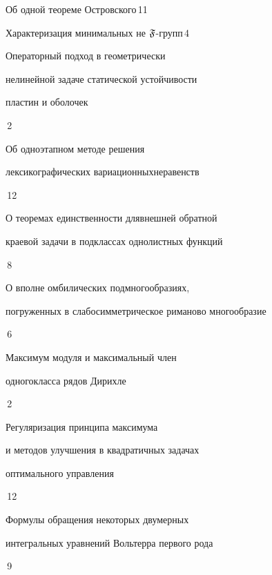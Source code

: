 

{Об одной теореме Островского}{\No\,11}




{Характеризация минимальных не $\frak F$-групп}{\No\,4}




{Операторный подход в геометрически\newline


нелинейной задаче статической устойчивости


пластин и оболочек}{\No\,2}




{Об одноэтапном методе решения


лексикографических вариационных\newline неравенств}{\No\,12}




{О теоремах единственности для\newline внешней обратной 


краевой задачи в подклассах однолистных функций}{\No\,8}




{О вполне омбилических подмногообразиях,


погруженных в слабо\newline симметрическое риманово многообразие}{\No\,6}




{Максимум модуля и максимальный член


одного\newline класса рядов Дирихле}{\No\,2}




{Регуляризация принципа максимума\newline


и методов улучшения в квадратичных задачах


оптимального управления}{\No\,12}






{Формулы обращения некоторых двумерных\newline


интегральных уравнений Вольтерра первого рода}{\No\,9}


